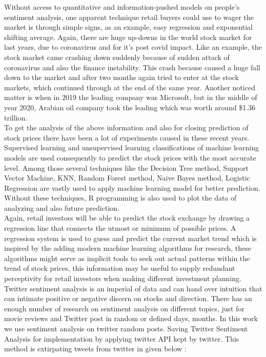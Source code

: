 Without access to quantitative and information-pushed models on people’s sentiment analysis, one apparent technique retail buyers could use to wager the market is through simple signs, as an example, easy regression and exponential shifting average. Again, there are huge up-downs in the world stock market for last years, due to coronavirus and for it's post covid impact. Like an example, the stock market came crashing down suddenly because of sudden attack of coronavirus and also the finance instability. This crash because caused a huge fall down to the market and after two months again tried to enter at the stock markets, which continued through at the end of the same year. Another noticed matter is when in 2019 the leading company was Microsoft, but in the middle of year 2020, Arabian oil company took the leading which was worth around \$1.36 trillion.\\

To get the analysis of the above information and also for closing prediction of stock prices there have been a lot of experiments caused in these recent years. Supervised learning and unsupervised learning classifications of machine learning models are used consequently to predict the stock prices with the most accurate level. Among those several techniques like the Decision Tree method, Support Vector Machine, KNN, Random Forest method, Naive Bayes method, Logistic Regression are vastly used to apply machine learning model for better prediction. Without these techniques, R programming is also used to plot the data of analyzing and also future prediction.\\

Again, retail investors will be able to predict the stock exchange by drawing a regression line that connects the utmost or minimum of possible prices. A regression system is used to guess and predict the current market trend which is inspired by the adding modern machine learning algorithms for research, these algorithms might serve as implicit tools to seek out actual patterns within the trend of stock prices, this information may be useful to supply redundant perceptivity for retail investors when making different investment planning.\\

Twitter sentiment analysis is an imperial of data and can hand over intuition that can intimate positive or negative discern on stocks and direction. There has an enough number of research on sentiment analysis on different topics, just for movie reviews and Twitter post in random or defined days, months. In this work we use sentiment analysis on twitter random posts. Saving Twitter Sentiment Analysis for implementation by applying twitter API kept by twitter. This method is extirpating tweets from twitter in given below :\\

